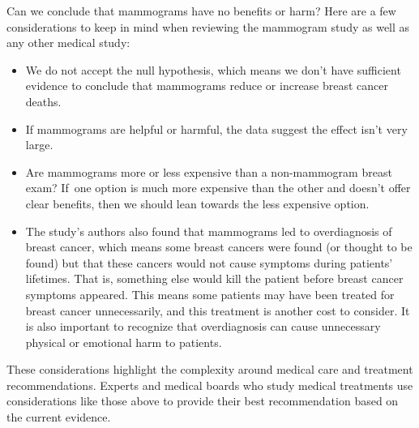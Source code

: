 Can we conclude that mammograms have no benefits or harm?
Here are a few considerations to keep in mind when reviewing
the mammogram study as well as any other medical study:
\begin{itemize}
\setlength{\itemsep}{0mm}
\item
    We do not accept the null hypothesis, which means
    we don't have sufficient evidence to conclude that
    mammograms reduce or increase breast cancer deaths.
\item
    If mammograms are helpful or harmful, the data
    suggest the effect isn't very large.
\item
    Are mammograms more or less expensive than
    a non-mammogram breast exam?
    If~one option is much more expensive than the
    other and doesn't offer clear benefits,
    then we should lean towards the less expensive
    option.
\item
    The study's authors also found that mammograms
    led to overdiagnosis of breast cancer,
    which means some breast cancers were found
    (or thought to be found) but that these cancers
    would not cause symptoms during patients' lifetimes.
    That is, something else would kill the patient
    before breast cancer symptoms appeared.
    This means some patients may have been treated
    for breast cancer unnecessarily, and this
    treatment is another cost to consider.
    It is also important to recognize that
    overdiagnosis can cause unnecessary physical
    or emotional harm to patients.
\end{itemize}
These considerations highlight the complexity around medical care and treatment recommendations. Experts and medical boards who study medical treatments use considerations like those above to provide their best recommendation based on the current evidence.


